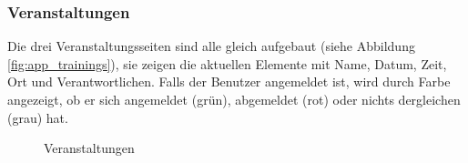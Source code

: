 \subsubsection{Veranstaltungen}
Die drei Veranstaltungsseiten sind alle gleich aufgebaut (siehe Abbildung \ref{fig:app_trainings}), sie zeigen die aktuellen Elemente mit Name, Datum, Zeit, Ort und Verantwortlichen. Falls der Benutzer angemeldet ist, wird durch Farbe angezeigt, ob er sich angemeldet (grün), abgemeldet (rot) oder nichts dergleichen (grau) hat.
\begin{figure}[ht]
\centering
{}
\label{fig:app_singinobjects}
\caption{Veranstaltungen}
\end{figure}

